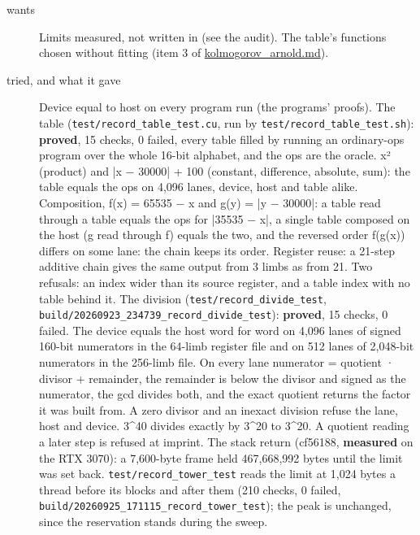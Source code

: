 \begin{description}
\item[{wants}] Limits measured, not written in (see the audit). The table's functions chosen without fitting (item 3 of \hyperref[chap:kolmogorov-arnold]{kolmogorov\_\allowbreak{}arnold.md}).
\item[{tried, and what it gave}] Device equal to host on every program run (the programs' proofs). The table (\texttt{test/\allowbreak{}record\_\allowbreak{}table\_\allowbreak{}test.\allowbreak{}cu}, run by \texttt{test/\allowbreak{}record\_\allowbreak{}table\_\allowbreak{}test.\allowbreak{}sh}): \textbf{proved}, 15 checks, 0 failed, every table filled by running an ordinary-ops program over the whole 16-bit alphabet, and the ops are the oracle. x² (product) and |x − 30000| + 100 (constant, difference, absolute, sum): the table equals the ops on 4,096 lanes, device, host and table alike. Composition, f(x) = 65535 − x and g(y) = |y − 30000|: a table read through a table equals the ops for |35535 − x|, a single table composed on the host (g read through f) equals the two, and the reversed order f(g(x)) differs on some lane: the chain keeps its order. Register reuse: a 21-step additive chain gives the same output from 3 limbs as from 21. Two refusals: an index wider than its source register, and a table index with no table behind it. The division (\texttt{test/\allowbreak{}record\_\allowbreak{}divide\_\allowbreak{}test}, \texttt{build/\allowbreak{}20260923\_\allowbreak{}234739\_\allowbreak{}record\_\allowbreak{}divide\_\allowbreak{}test}): \textbf{proved}, 15 checks, 0 failed. The device equals the host word for word on 4,096 lanes of signed 160-bit numerators in the 64-limb register file and on 512 lanes of 2,048-bit numerators in the 256-limb file. On every lane numerator = quotient · divisor + remainder, the remainder is below the divisor and signed as the numerator, the gcd divides both, and the exact quotient returns the factor it was built from. A zero divisor and an inexact division refuse the lane, host and device. 3\textasciicircum{}40 divides exactly by 3\textasciicircum{}20 to 3\textasciicircum{}20. A quotient reading a later step is refused at imprint. The stack return (cf56188, \textbf{measured} on the RTX 3070): a 7,600-byte frame held 467,668,992 bytes until the limit was set back. \texttt{test/\allowbreak{}record\_\allowbreak{}tower\_\allowbreak{}test} reads the limit at 1,024 bytes a thread before its blocks and after them (210 checks, 0 failed, \texttt{build/\allowbreak{}20260925\_\allowbreak{}171115\_\allowbreak{}record\_\allowbreak{}tower\_\allowbreak{}test}); the peak is unchanged, since the reservation stands during the sweep.

\end{description}
